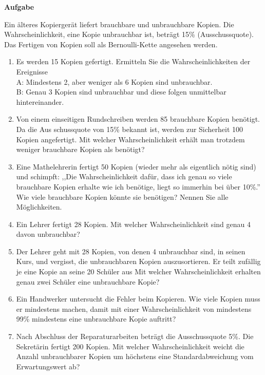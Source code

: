 \documentclass[a4paper,12pt]{article}
\newcounter{aufgabencounter}
\newcommand{\aufgabeNr}{\stepcounter{aufgabencounter}{\theaufgabencounter}}
\newcommand{\Aufgabe}[1]{
  {
  \vspace*{0.5cm}
  \textsf{\textbf{Aufgabe \aufgabeNr} #1}
  \vspace*{0.2cm}
  
  }
}
\begin{document}
\vspace{2cm}


\Aufgabe{} 

Ein älteres Kopiergerät liefert brauchbare und unbrauchbare Kopien. Die Wahrscheinlichkeit, eine Kopie unbrauchbar ist, beträgt 15\% (Ausschussquote). Das Fertigen von Kopien soll als Bernoulli-Kette angesehen werden.

\begin{enumerate}[label={\alph*)}]
  \item Es werden 15 Kopien gefertigt. Ermitteln Sie die Wahrscheinlichkeiten der Ereignisse\\
    A: Mindestens 2, aber weniger als 6 Kopien sind unbrauchbar.\\
    B: Genau 3 Kopien sind unbrauchbar und diese folgen unmittelbar hintereinander.
  \item Von einem einseitigen Rundschreiben werden 85 brauchbare Kopien benötigt. Da die Aus schussquote von 15\% bekannt ist, werden zur Sicherheit 100 Kopien angefertigt. Mit welcher Wahrscheinlichkeit erhält man trotzdem weniger brauchbare Kopien als benötigt?
  \item Eine Mathelehrerin fertigt 50 Kopien (wieder mehr als eigentlich nötig sind) und schimpft: ,,Die Wahrscheinlichkeit dafür, dass ich genau so viele brauchbare Kopien erhalte wie ich benötige, liegt so immerhin bei über 10\%.'' Wie viele brauchbare Kopien könnte sie benötigen? Nennen Sie alle Möglichkeiten.
  \item Ein Lehrer fertigt 28 Kopien. Mit welcher Wahrscheinlichkeit sind genau 4 davon unbrauchbar?
  \item Der Lehrer geht mit 28 Kopien, von denen 4 unbrauchbar sind, in seinen Kurs, und vergisst, die unbrauchbaren Kopien auszusortieren. Er teilt zufällig je eine Kopie an seine 20 Schüler aus Mit welcher Wahrscheinlichkeit erhalten genau zwei Schüler eine unbrauchbare Kopie?
  \item Ein Handwerker untersucht die Fehler beim Kopieren. Wie viele Kopien muss er mindestens machen, damit mit einer Wahrscheinlichkeit von mindestens 99\% mindestens eine unbrauchbare Kopie auftritt? 
  \item Nach Abschluss der Reparaturarbeiten beträgt die Ausschussquote 5\%. Die Sekretärin fertigt 200 Kopien. Mit welcher Wahrscheinlichkeit weicht die Anzahl unbrauchbarer Kopien um höchstens eine Standardabweichung vom Erwartungswert ab?\\
\end{enumerate}
\end{document}
